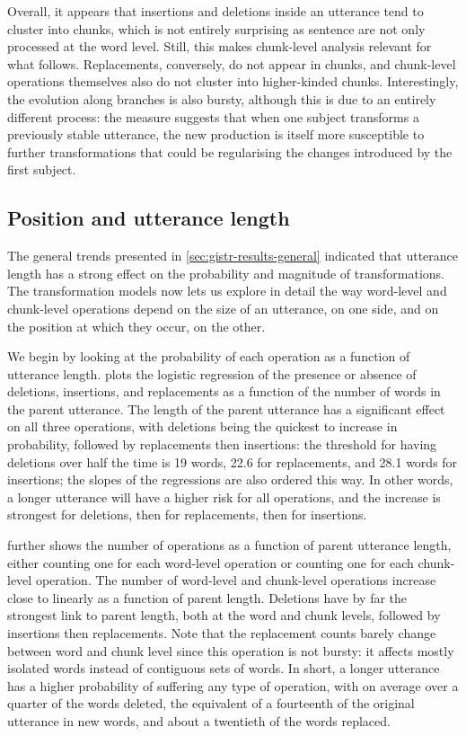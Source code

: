 \documentclass[a4paper,fleqn]{cas-dc}
\begin{document}
\bigskip
Overall, it appears that insertions and deletions inside an utterance
tend to cluster into chunks, which is not entirely surprising as sentence
are not only processed at the word level. Still, this makes
chunk-level analysis relevant for what follows. Replacements,
conversely, do not appear in chunks, and chunk-level operations
themselves also do not cluster into higher-kinded chunks. Interestingly,
the evolution along branches is also bursty, although this is due to an
entirely different process: the measure suggests that when one subject
transforms a previously stable utterance, the new production is itself
more susceptible to further transformations that could be regularising
the changes introduced by the first subject.

\subsection{Position and utterance length}\label{position-and-utterance-length}

The general trends presented in \cref{sec:gistr-results-general}
indicated that utterance length has a strong effect on the probability
and magnitude of transformations. The transformation models now lets us
explore in detail the way word-level and chunk-level operations depend
on the size of an utterance, on one side, and on the position at which
they occur, on the other.

We begin by looking at the probability of each operation as a function
of utterance length.  plots the logistic
regression of the presence or absence of deletions, insertions, and
replacements as a function of the number of words in the parent
utterance. The length of the parent utterance has a significant effect
on all three operations, with deletions being the quickest to increase
in probability, followed by replacements then insertions: the threshold
for having deletions over half the time is 19 words, 22.6 for
replacements, and 28.1 words for insertions; the slopes of the
regressions are also ordered this way. In other words, a longer
utterance will have a higher risk for all operations, and the increase
is strongest for deletions, then for replacements, then for insertions.

 further shows the number of operations as a
function of parent utterance length, either counting one for each
word-level operation or counting one for each chunk-level operation. The
number of word-level and chunk-level operations increase close to
linearly as a function of parent length. Deletions have by far the
strongest link to parent length, both at the word and chunk levels,
followed by insertions then replacements. Note that the replacement
counts barely change between word and chunk level since this operation
is not bursty: it affects mostly isolated words instead of contiguous
sets of words. In short, a longer utterance has a higher probability of
suffering any type of operation, with on average over a quarter of the
words deleted, the equivalent of a fourteenth of the original utterance
in new words, and about a twentieth of the words replaced.
\end{document}
